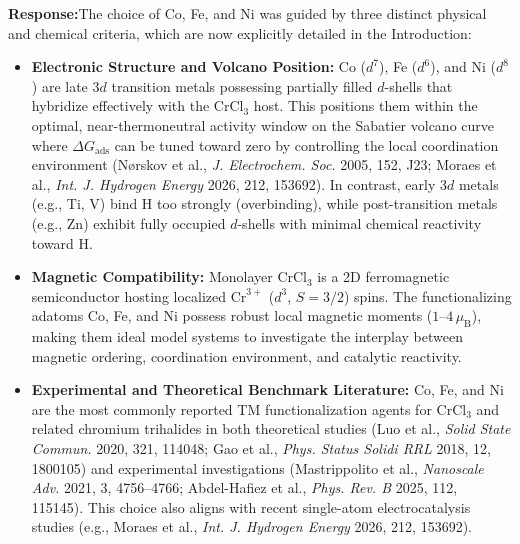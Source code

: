 \documentclass[11pt, sans, a4paper]{moderncv}
\newcommand{\response}{\vspace{0.4em}\noindent\textbf{\color{actionblue}Response:}\hspace{0.5em}}
\begin{document}
\response The choice of Co, Fe, and Ni was guided by three distinct physical and chemical criteria, which are now explicitly detailed in the Introduction:
\begin{itemize}[leftmargin=1.5em, itemsep=0.2em]
    \item \textbf{Electronic Structure and Volcano Position:} Co ($d^7$), Fe ($d^6$), and Ni ($d^8$) are late $3d$ transition metals possessing partially filled $d$-shells that hybridize effectively with the $\text{CrCl}_3$ host. This positions them within the optimal, near-thermoneutral activity window on the Sabatier volcano curve where $\Delta G_{\mathrm{ads}}$ can be tuned toward zero by controlling the local coordination environment (N{\o}rskov et al., \textit{J. Electrochem. Soc.} 2005, 152, J23; Moraes et al., \textit{Int. J. Hydrogen Energy} 2026, 212, 153692). In contrast, early $3d$ metals (e.g., Ti, V) bind H too strongly (overbinding), while post-transition metals (e.g., Zn) exhibit fully occupied $d$-shells with minimal chemical reactivity toward H.
    \item \textbf{Magnetic Compatibility:} Monolayer $\text{CrCl}_3$ is a 2D ferromagnetic semiconductor hosting localized $\text{Cr}^{3+}$ ($d^3$, $S=3/2$) spins. The functionalizing adatoms Co, Fe, and Ni possess robust local magnetic moments ($1\text{--}4\,\mu_{\mathrm{B}}$), making them ideal model systems to investigate the interplay between magnetic ordering, coordination environment, and catalytic reactivity.
    \item \textbf{Experimental and Theoretical Benchmark Literature:} Co, Fe, and Ni are the most commonly reported TM functionalization agents for $\text{CrCl}_3$ and related chromium trihalides in both theoretical studies (Luo et al., \textit{Solid State Commun.} 2020, 321, 114048; Gao et al., \textit{Phys. Status Solidi RRL} 2018, 12, 1800105) and experimental investigations (Mastrippolito et al., \textit{Nanoscale Adv.} 2021, 3, 4756--4766; Abdel-Hafiez et al., \textit{Phys. Rev. B} 2025, 112, 115145). This choice also aligns with recent single-atom electrocatalysis studies (e.g., Moraes et al., \textit{Int. J. Hydrogen Energy} 2026, 212, 153692).
\end{itemize}
\end{document}
